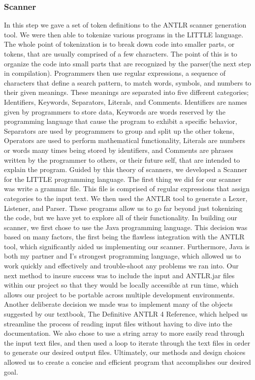 \documentclass[sigconf]{acmart}
\begin{document}
\subsubsection{Scanner} 
In this step we gave a set of token definitions to the ANTLR scanner generation tool. We were then able to tokenize various programs in the LITTLE language. The whole point of tokenization is to break down code into smaller parts, or tokens, that are usually comprised of a few characters. The point of this is to organize the code into small parts that are recognized by the parser(the next step in compilation).
 Programmers then use regular expressions, a sequence of characters that define a search pattern, to match words, symbols, and numbers to their given meanings. These meanings are separated into five different categories; Identifiers, Keywords, Separators, Literals, and Comments. Identifiers are names given by programmers to store data, Keywords are words reserved by the programming language that cause the program to exhibit a specific behavior, Separators are used by programmers to group and split up the other tokens, Operators are used to perform mathematical functionality, Literals are numbers or words many times being stored by identifiers, and Comments are phrases written by the programmer to others, or their future self, that are intended to explain the program.
\newline
Guided by this theory of scanners, we developed a Scanner for the LITTLE programming language. The first thing we did for our scanner was write a grammar file. This file is comprised of regular expressions that assign categories to the input text. We then used the ANTLR tool to generate a Lexer, Listener, and Parser. These programs allow us to go far beyond just tokenizing the code, but we have yet to explore all of their functionality. In building our scanner, we first chose to use the Java programming language. This decision was based on many factors, the first being the flawless integration with the ANTLR tool, which significantly aided us implementing our scanner. Furthermore, Java is both my partner and I's strongest programming language, which allowed us to work quickly and effectively and trouble-shoot any problems we ran into. Our next method to insure success was to include the input and ANTLR.jar files within our project so that they would be locally accessible at run time, which allows our project to be portable across multiple development environments. Another deliberate decision we made was to implement many of the objects suggested by our textbook, The Definitive ANTLR 4 Reference, which helped us streamline the process of reading input files without having to dive into the documentation. We also chose to use a string array to more easily read through the input text files, and then used a loop to iterate through the text files in order to generate our desired output files. Ultimately, our methods and design choices allowed us to create a concise and efficient program that accomplishes our desired goal.
\end{document}
